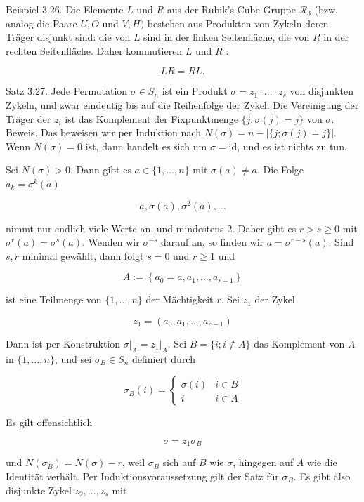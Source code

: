 \documentclass[10pt, letterpaper]{article}
\begin{document}
Beispiel 3.26. Die Elemente $L$ und $R$ aus der Rubik's Cube Gruppe $\mathscr{R}_{3}$ (bzw. analog die Paare $U, O$ und $V, H)$ bestehen aus Produkten von Zykeln deren Träger disjunkt sind: die von $L$ sind in der linken Seitenfläche, die von $R$ in der rechten Seitenfläche. Daher kommutieren $L$ und $R$ :

$$
L R=R L .
$$

Satz 3.27. Jede Permutation $\sigma \in S_{n}$ ist ein Produkt $\sigma=z_{1} \cdot \ldots \cdot z_{s}$ von disjunkten Zykeln, und zwar eindeutig bis auf die Reihenfolge der Zykel. Die Vereinigung der Träger der $z_{i}$ ist das Komplement der Fixpunktmenge $\{j ; \sigma(j)=j\}$ von $\sigma$.\\
Beweis. Das beweisen wir per Induktion nach $N(\sigma)=n-|\{j ; \sigma(j)=j\}|$. Wenn $N(\sigma)=0$ ist, dann handelt es sich um $\sigma=\mathrm{id}$, und es ist nichts zu tun.

Sei $N(\sigma)>0$. Dann gibt es $a \in\{1, \ldots, n\}$ mit $\sigma(a) \neq a$. Die Folge $a_{k}=\sigma^{k}(a)$

$$
a, \sigma(a), \sigma^{2}(a), \ldots
$$

nimmt nur endlich viele Werte an, und mindestens 2. Daher gibt es $r>s \geq 0$ mit $\sigma^{r}(a)=\sigma^{s}(a)$. Wenden wir $\sigma^{-s}$ darauf an, so finden wir $a=\sigma^{r-s}(a)$. Sind $s, r$ minimal gewählt, dann folgt $s=0$ und $r \geq 1$ und

$$
A:=\left\{a_{0}=a, a_{1}, \ldots, a_{r-1}\right\}
$$

ist eine Teilmenge von $\{1, \ldots, n\}$ der Mächtigkeit $r$. Sei $z_{1}$ der Zykel

$$
z_{1}=\left(a_{0}, a_{1}, \ldots, a_{r-1}\right)
$$

Dann ist per Konstruktion $\left.\sigma\right|_{A}=\left.z_{1}\right|_{A}$. Sei $B=\{i ; i \notin A\}$ das Komplement von $A$ in $\{1, \ldots, n\}$, und sei $\sigma_{B} \in S_{n}$ definiert durch

$$
\sigma_{B}(i)= \begin{cases}\sigma(i) & i \in B \\ i & i \in A\end{cases}
$$

Es gilt offensichtlich

$$
\sigma=z_{1} \sigma_{B}
$$

und $N\left(\sigma_{B}\right)=N(\sigma)-r$, weil $\sigma_{B}$ sich auf $B$ wie $\sigma$, hingegen auf $A$ wie die Identität verhält. Per Induktionsvoraussetzung gilt der Satz für $\sigma_{B}$. Es gibt also disjunkte Zykel $z_{2}, \ldots, z_{s}$ mit
\end{document}
